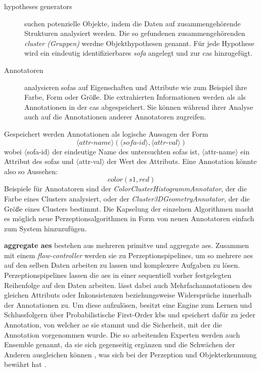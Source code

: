 \begin{description}
\item[hypotheses generators] suchen potenzielle Objekte, indem die Daten auf zusammengehörende Strukturen analysiert werden. Die so gefundenen zusammengehörenden \textit{cluster (Gruppen)} werdne Objekthypothesen genannt. Für jede Hypothese wird ein eindeutig identifizierbares \textit{\gls{sofa}} angelegt und zur \gls{cas} hinzugefügt.
\item[Annotatoren] analysieren \glspl{sofa} auf Eigenschaften und Attribute wie zum Beispiel ihre Farbe, Form oder Größe. Die extrahierten Informationen werden als als Annotationen in der \gls{cas} abgespeichert. Sie können während ihrer Analyse auch auf die Annotationen anderer Annotatoren zugreifen.\end{description} Gespeichert werden Annotationen als logische Aussagen der Form 
\begin{displaymath}
\langle attr\text{-}name \rangle (\langle sofa\text{-}id \rangle , \langle attr\text{-}val \rangle)
\end{displaymath}
wobei $\langle$sofa-id$\rangle$ der eindeutige Name des untersuchten \glspl{sofa} ist, $\langle$attr-name$\rangle$ ein Attribut des \glspl{sofa} und $\langle$attr-val$\rangle$ der Wert des Attributs. Eine Annotation könnte also so Aussehen: 
\begin{displaymath}
color(s1, red)
\end{displaymath}
Beispiele für Annotatoren sind der \textit{ColorClusterHistogrammAnnotator}, der die Farbe eines Clusters analysiert, oder der \textit{Cluster3DGeometryAnnotator}, der die Größe eines Clusters bestimmt. Die Kapselung der einzelnen Algorithmen macht es möglich neue Perzeptionsalgorithmen in Form von neuen Annotatoren einfach zum System hinzuzufügen. \par

\textbf{aggregate \glspl{ae}} bestehen aus mehreren primitve und aggregate \glspl{ae}. Zusammen mit einem \textit{flow-controller} werden sie zu Perzeptionspipelines, um so mehrere \glspl{ae} auf den selben Daten arbeiten zu lassen und komplexere Aufgaben zu lösen. Perzeptionspipelines lassen die \glspl{ae} in einer sequentiell vorher festgelegten Reihenfolge auf den Daten arbeiten. \robosherlock lässt dabei auch Mehrfachannotationen des gleichen Attributs oder Inkonsistenzen beziehungsweise Widersprüche innerhalb der Annotationen zu. Um diese aufzulösen, besitzt \robosherlock eine Engine zum Lernen und Schlussfolgern über Probabilistische First-Order \glspl{kb} und speichert dafür zu jeder Annotation, von welcher \gls{ae} sie stammt und die Sicherheit, mit der die Annotation vorgenommen wurde. Die so arbeitenden Experten werden auch Ensemble genannt, da sie sich gegenseitig ergänzen und die Schwächen der Anderen ausgleichen können \cite{polikar}, was sich bei der Perzeption und Objekterkennnung bewährt hat \cite{multimodalTemplate, atrBasedObjIden, pronobis1, pr2looking}.  
  
